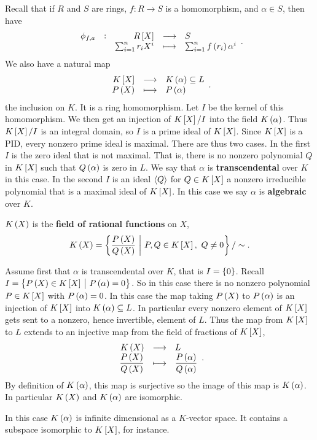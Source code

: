 Recall that if $ R $ and $ S $ are rings, $ f : R \to S $ is a homomorphism, and $ \alpha \in S $, then have
$$ \function[\phi_{f, a}]{R\sbr{X}}{S}{\sum_{i = 1}^n r_iX^i}{\sum_{i = 1}^n f\br{r_i}\alpha^i}. $$
We also have a natural map
$$ \function{K\sbr{X}}{K\br{\alpha} \subseteq L}{P\br{X}}{P\br{\alpha}}. $$
the inclusion on $ K $. It is a ring homomorphism. Let $ I $ be the kernel of this homomorphism. We then get an injection of $ K\sbr{X} / I $ into the field $ K\br{\alpha} $. Thus $ K\sbr{X} / I $ is an integral domain, so $ I $ is a prime ideal of $ K\sbr{X} $. Since $ K\sbr{X} $ is a PID, every nonzero prime ideal is maximal. There are thus two cases. In the first $ I $ is the zero ideal that is not maximal. That is, there is no nonzero polynomial $ Q $ in $ K\sbr{X} $ such that $ Q\br{\alpha} $ is zero in $ L $. We say that $ \alpha $ is \textbf{transcendental} over $ K $ in this case. In the second $ I $ is an ideal $ \left\langle Q \right\rangle $ for $ Q \in K\sbr{X} $ a nonzero irreducible polynomial that is a maximal ideal of $ K\sbr{X} $. In this case we say $ \alpha $ is \textbf{algebraic} over $ K $.

\begin{definition}
$ K\br{X} $ is the \textbf{field of rational functions} on $ X $,
$$ K\br{X} = \cbr{\dfrac{P\br{X}}{Q\br{X}} \st P, Q \in K\sbr{X}, \ Q \ne 0} / \sim. $$
\end{definition}

Assume first that $ \alpha $ is transcendental over $ K $, that is $ I = \cbr{0} $. Recall $ I = \cbr{P\br{X} \in K\sbr{X} \st P\br{\alpha} = 0} $. So in this case there is no nonzero polynomial $ P \in K\sbr{X} $ with $ P\br{\alpha} = 0 $. In this case the map taking $ P\br{X} $ to $ P\br{\alpha} $ is an injection of $ K\sbr{X} $ into $ K\br{\alpha} \subseteq L $. In particular every nonzero element of $ K\sbr{X} $ gets sent to a nonzero, hence invertible, element of $ L $. Thus the map from $ K\sbr{X} $ to $ L $ extends to an injective map from the field of fractions of $ K\sbr{X} $,
$$ \function{K\br{X}}{L}{\dfrac{P\br{X}}{Q\br{X}}}{\dfrac{P\br{\alpha}}{Q\br{\alpha}}}. $$
By definition of $ K\br{\alpha} $, this map is surjective so the image of this map is $ K\br{\alpha} $. In particular $ K\br{X} $ and $ K\br{\alpha} $ are isomorphic.

\begin{note*}
In this case $ K\br{\alpha} $ is infinite dimensional as a $ K $-vector space. It contains a subspace isomorphic to $ K\sbr{X} $, for instance.
\end{note*}

